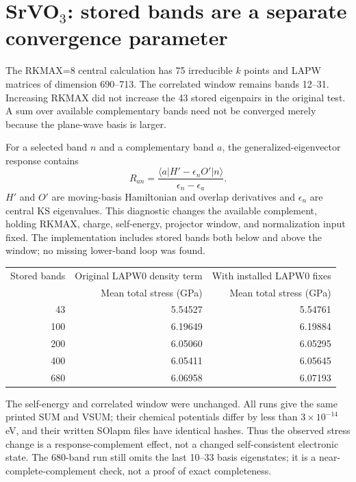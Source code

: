 \documentclass[11pt]{article}
\begin{document}
\section{\texorpdfstring{SrVO$_3$}{SrVO3}: stored bands are a separate convergence parameter}
The RKMAX=8 central calculation has 75 irreducible $k$ points and LAPW matrices of dimension 690--713. The correlated window remains bands 12--31. Increasing RKMAX did not increase the 43 stored eigenpairs in the original test. A sum over available complementary bands need not be converged merely because the plane-wave basis is larger.

For a selected band $n$ and a complementary band $a$, the generalized-eigenvector response contains
\begin{equation}
 R_{an}=\frac{\langle a|H'-\epsilon_nO'|n\rangle}{\epsilon_n-\epsilon_a}.
\end{equation}
$H'$ and $O'$ are moving-basis Hamiltonian and overlap derivatives and $\epsilon_n$ are central KS eigenvalues. This diagnostic changes the available complement, holding RKMAX, charge, self-energy, projector window, and normalization input fixed. The implementation includes stored bands both below and above the window; no missing lower-band loop was found.

\begin{center}
\begin{tabular}{rrr}\toprule
Stored bands & Original LAPW0 density term & With installed LAPW0 fixes\\
 & Mean total stress (GPa) & Mean total stress (GPa)\\\midrule
43 & 5.54527 & 5.54761\\
100 & 6.19649 & 6.19884\\
200 & 6.05060 & 6.05295\\
400 & 6.05411 & 6.05645\\
680 & 6.06958 & 6.07193\\\bottomrule
\end{tabular}
\end{center}
The self-energy and correlated window were unchanged. All runs give the same printed SUM and VSUM; their chemical potentials differ by less than $3\times10^{-14}$ eV, and their written SOlapm files have identical hashes. Thus the observed stress change is a response-complement effect, not a changed self-consistent electronic state. The 680-band run still omits the last 10--33 basis eigenstates; it is a near-complete-complement check, not a proof of exact completeness.
\end{document}
